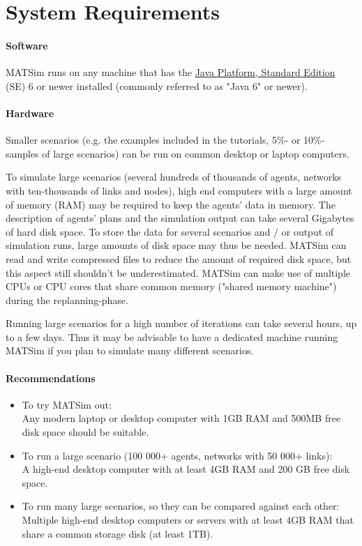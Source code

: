 \chapter{System Requirements}


\bigskip

\subsubsection{Software}

MATSim runs on any machine that has the \href{http://java.sun.com/javase/downloads/index.jsp}{Java Platform, Standard Edition} (SE) 6 or newer installed (commonly referred to as "Java 6" or newer).

\subsubsection{Hardware}

Smaller  scenarios (e.g. the examples included in the tutorials, 5\%- or  10\%-samples of large scenarios) can be run on common desktop or laptop  computers.

To simulate large scenarios (several hundreds of  thousands of agents, networks with ten-thousands of links and nodes),  high end computers with a large amount of memory (RAM) may be required  to keep the agents' data in memory. The description of agents' plans and  the simulation output can take several Gigabytes of hard disk space. To  store the data for several scenarios and / or output of simulation  runs, large amounts of disk space may thus be needed. MATSim can read  and write compressed files to reduce the amount of required disk space,  but this aspect still shouldn't be underestimated. MATSim can make use  of multiple CPUs or CPU cores that share common memory ("shared memory  machine") during the replanning-phase.

Running large scenarios for  a high number of iterations can take several hours, up to a few days.  Thus it may be advisable to have a dedicated machine running MATSim if  you plan to simulate many different scenarios.

\subsubsection{Recommendations}
\begin{itemize}
	\item To try MATSim out:
\\Any modern laptop or desktop computer with 1GB RAM and 500MB free disk space should be suitable.
	\item To run a large scenario (100 000+ agents, networks with 50 000+ links): 
\\A high-end desktop computer with at least 4GB RAM and 200 GB free disk space.
	\item To run many large scenarios, so they can be compared against each other: 
\\Multiple high-end desktop computers or servers with at least 4GB RAM that share a common storage disk (at least 1TB).
\end{itemize}

